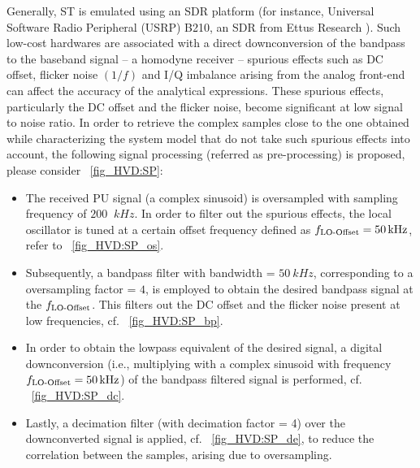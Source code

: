 Generally, ST is emulated using an SDR platform (for instance, Universal Software Radio Peripheral (USRP) B210, an SDR from Ettus Research \cite{Ettus}). Such low-cost hardwares are associated with a direct downconversion of the bandpass to the baseband signal -- a homodyne receiver -- spurious effects such as DC offset, flicker noise $(1/f)$ and I/Q imbalance arising from the analog front-end can affect the accuracy of the analytical expressions. These spurious effects, particularly the DC offset and the flicker noise, become significant at low signal to noise ratio. In order to retrieve the complex samples close to the one obtained while characterizing the system model that do not take such spurious effects into account, the following signal processing (referred as pre-processing) is proposed, please consider \figurename~\ref{fig_HVD:SP}:
\begin{itemize}
\item The received PU signal (a complex sinusoid) is oversampled with sampling frequency of $200$ $\SI{}{kHz}$.
In order to filter out the spurious effects, the local oscillator is tuned at a certain offset frequency defined as $f_{\text{LO-Offset}} = \SI{50}{kHz}$, refer to \figurename~\ref{fig_HVD:SP_os}.
\item Subsequently, a bandpass filter with bandwidth = $\SI{50}{kHz}$, corresponding to a oversampling factor = $4$, is employed to obtain the desired bandpass signal at the $f_{\text{LO-Offset}}$. This filters out the DC offset and the flicker noise present at low frequencies, cf. \figurename~\ref{fig_HVD:SP_bp}.
\item In order to obtain the lowpass equivalent of the desired signal, a digital downconversion (i.e., multiplying with a complex sinusoid with frequency $f_{\text{LO-Offset}} = \SI{50}{kHz}$) of the bandpass filtered signal is performed, cf. \figurename~\ref{fig_HVD:SP_dc}. %
\item Lastly, a decimation filter (with decimation factor = 4) over the downconverted signal is applied, cf. \figurename~\ref{fig_HVD:SP_de}, to reduce the correlation between the samples, arising due to oversampling.
\end{itemize}

